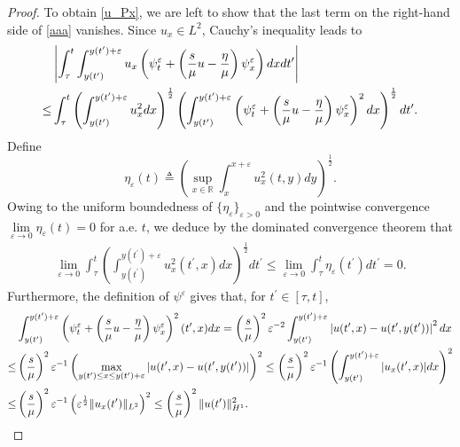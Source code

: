 \documentclass[10pt]{article}
\numberwithin{equation}{section}
\begin{document}
\begin{proof}
		To obtain \eqref{u_Px}, we are left to show that the last term on the right-hand side of \eqref{aaa} vanishes. Since $u_x\in L^2$, Cauchy’s inequality leads to
		\begin{align}
			&\left|\int_{\tau}^{t}\int_{y(t^\prime)}^{y(t^\prime)+\varepsilon}u_{x}\left(\psi_{t}^{\varepsilon}+\left(\frac{s}{\mu}u-\frac{\eta}{\mu}\right)\psi_{x}^{\varepsilon}\right)dxdt^\prime\right|\notag\\
			\leq&\int_{\tau}^{t}\left(\int_{y(t^\prime)}^{y(t^\prime)+\varepsilon}u_{x}^2dx\right)^{\frac{1}{2}}\left(\int_{y(t^\prime)}^{y(t^\prime)+\varepsilon}\left(\psi_{t}^{\varepsilon}+\left(\frac{s}{\mu}u-\frac{\eta}{\mu}\right)\psi_{x}^{\varepsilon}\right)^2dx\right)^{\frac{1}{2}}dt^\prime.\label{bbb}
		\end{align}
		Define
		$$\eta_\varepsilon(t)\triangleq\left(\sup_{x\in\mathbb{R}}\int_{x}^{x+\varepsilon}u_x^2(t,y)dy\right)^{\frac{1}{2}}.$$		
		Owing to the uniform boundedness of $\{\eta_{\varepsilon}\}_{\varepsilon>0}$ and the pointwise convergence $\lim\limits_{\varepsilon\to0}\eta_{\varepsilon}(t)=0$ for a.e. $t$, we deduce by the dominated convergence theorem that 
		\begin{align}\label{ccc}
			\lim_{\varepsilon\to0}\int_{\tau}^{t}\left(\int_{y(t^\prime)}^{y(t^\prime)+\varepsilon}u_{x}^2(t^\prime,x)dx\right)^{\frac{1}{2}}dt^\prime\leq\lim_{\varepsilon\to0}\int_{\tau}^{t}\eta_\varepsilon(t^\prime)dt^\prime=0.
		\end{align}
		Furthermore, the definition of $\psi^\varepsilon$ gives that, for $t^\prime\in[\tau,t]$,
		\begin{align}
			&\int_{y(t^\prime)}^{y(t^\prime)+\varepsilon}\left(\psi_{t}^{\varepsilon}+\left(\frac{s}{\mu}u-\frac{\eta}{\mu}\right)\psi_{x}^{\varepsilon}\right)^2(t^\prime,x)dx=\left(\frac{s}{\mu}\right)^2\varepsilon^{-2}\int_{y(t^\prime)}^{y(t^\prime)+\varepsilon}\left|u(t^\prime,x)-u(t^\prime,y(t^\prime))\right|^2dx\notag\\
			\leq&\left(\frac{s}{\mu}\right)^2\varepsilon^{-1}\left(\max_{y(t^\prime)\leq x\leq y(t^\prime)+\varepsilon}|u(t^\prime,x)-u(t^\prime,y(t^\prime))|\right)^{2}\leq\left(\frac{s}{\mu}\right)^2\varepsilon^{-1}\left(\int_{y(t^\prime)}^{y(t^\prime)+\varepsilon}|u_{x}(t^\prime,x)|dx\right)^{2}\notag\\
			\leq&\left(\frac{s}{\mu}\right)^2\varepsilon^{-1}\left(\varepsilon^{\frac{1}{2}}\|u_{x}(t^\prime)\|_{L^{2}}\right)^{2}\leq\left(\frac{s}{\mu}\right)^2\|u(t^\prime)\|_{H^{1}}^{2}.\label{ddd}
		\end{align}

\end{proof}
\end{document}
